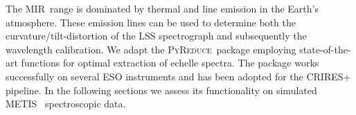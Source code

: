 \newcommand{\pyred}{\textsc{PyReduce}}
\newcommand{\met}{\ac{METIS}}
\newcommand{\mir}{\ac{MIR}}
\newcommand{\lss}{\ac{LSS}}
\newcommand{\elt}{\ac{ELT}}
\newcommand{\scope}{\textsc{ScopeSim}}


The \mir~range is dominated by thermal and line emission in the Earth's atmosphere. These emission lines can be used to determine both the curvature/tilt-distortion of the LSS spectrograph and subsequently the wavelength calibration. We adapt the \pyred~package \cite{pis21} employing state-of-the-art functions for optimal extraction of echelle spectra.  The package works successfully on several ESO instruments and has been adopted for the CRIRES+ pipeline. In the following sections we assess its functionality on simulated \met~ spectroscopic data.


